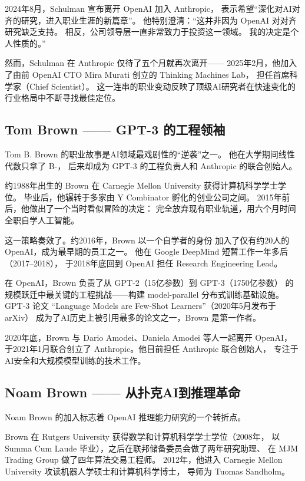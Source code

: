 2024年8月，Schulman 宣布离开 OpenAI 加入 Anthropic，
表示希望``深化对AI对齐的研究，进入职业生涯的新篇章''。
他特别澄清：``这并非因为 OpenAI 对对齐研究缺乏支持。
相反，公司领导层一直非常致力于投资这一领域。
我的决定是个人性质的。''

然而，Schulman 在 Anthropic 仅待了五个月就再次离开——
2025年2月，他加入了由前 OpenAI CTO Mira Murati 创立的 Thinking Machines Lab，
担任首席科学家（Chief Scientist）。
这一连串的职业变动反映了顶级AI研究者在快速变化的行业格局中不断寻找最佳定位。


\subsection{Tom Brown —— GPT-3 的工程领袖}
\label{subsec:tom-brown}

Tom B. Brown 的职业故事是AI领域最戏剧性的``逆袭''之一。
他在大学期间线性代数只拿了 B-，
后来却成为 GPT-3 的工程负责人和 Anthropic 的联合创始人。

约1988年出生的 Brown 在 Carnegie Mellon University 获得计算机科学学士学位。
毕业后，他辗转于多家由 Y Combinator 孵化的创业公司之间。
2015年前后，他做出了一个当时看似冒险的决定：
完全放弃现有职业轨道，用六个月时间全职自学人工智能。

这一策略奏效了。约2016年，Brown 以一个自学者的身份
加入了仅有约20人的 OpenAI，成为最早期的员工之一。
他在 Google DeepMind 短暂工作一年多后（2017--2018），
于2018年底回到 OpenAI 担任 Research Engineering Lead。

在 OpenAI，Brown 负责了从 GPT-2（15亿参数）到 GPT-3（1750亿参数）
的规模跃迁中最关键的工程挑战——构建 model-parallel 分布式训练基础设施。
GPT-3 论文 ``Language Models are Few-Shot Learners''（2020年5月发布于 arXiv）
成为了AI历史上被引用最多的论文之一，Brown 是第一作者。

2020年底，Brown 与 Dario Amodei、Daniela Amodei 等人一起离开 OpenAI，
于2021年1月联合创立了 Anthropic。他目前担任 Anthropic 联合创始人，
专注于AI安全和大规模模型训练的技术工作。


\subsection{Noam Brown —— 从扑克AI到推理革命}
\label{subsec:noam-brown}

Noam Brown 的加入标志着 OpenAI 推理能力研究的一个转折点。

Brown 在 Rutgers University 获得数学和计算机科学学士学位（2008年，
以 Summa Cum Laude 毕业），之后在联邦储备委员会做了两年研究助理、
在 MJM Trading Group 做了四年算法交易工程师。
2012年，他进入 Carnegie Mellon University 攻读机器人学硕士和计算机科学博士，
导师为 Tuomas Sandholm。

